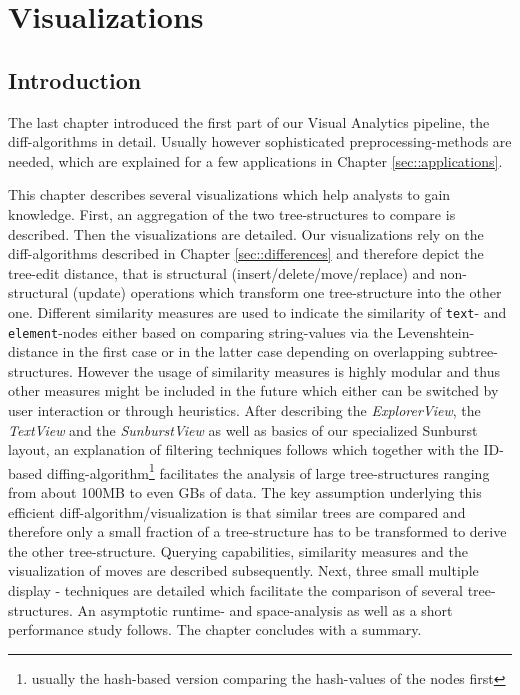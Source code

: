 \section{Visualizations}\label{sec::visualizations}
\subsection{Introduction}
The last chapter introduced the first part of our Visual Analytics pipeline, the diff-algorithms in detail. Usually however sophisticated preprocessing-methods are needed, which are explained for a few applications in Chapter \ref{sec::applications}.

This chapter describes several visualizations which help analysts to gain knowledge. First, an aggregation of the two tree-structures to compare is described. Then the visualizations are detailed. Our visualizations rely on the diff-algorithms described in Chapter \ref{sec::differences} and therefore depict the tree-edit distance, that is structural (insert/delete/move/replace) and non-structural (update) operations which transform one tree-structure into the other one. Different similarity measures are used to indicate the similarity of \texttt{text}- and \texttt{element}-nodes either based on comparing string-values via the Levenshtein-distance in the first case or in the latter case depending on overlapping subtree-structures. However the usage of similarity measures is highly modular and thus other measures might be included in the future which either can be switched by user interaction or through heuristics. After describing the \emph{ExplorerView}, the \emph{TextView} and the \emph{SunburstView} as well as basics of our specialized Sunburst layout, an explanation of filtering techniques follows which together with the ID-based diffing-algorithm\footnote{usually the hash-based version comparing the hash-values of the nodes first} facilitates the analysis of large tree-structures ranging from about 100MB to even GBs of data. The key assumption underlying this efficient diff-algorithm/visualization is that similar trees are compared and therefore only a small fraction of a tree-structure has to be transformed to derive the other tree-structure. Querying capabilities, similarity measures and the visualization of moves are described subsequently. Next, three small multiple display - techniques are detailed which facilitate the comparison of several tree-structures. An asymptotic runtime- and space-analysis as well as a short performance study follows. The chapter concludes with a summary.

